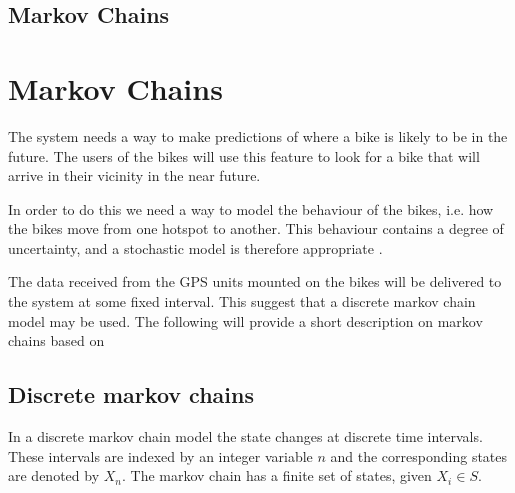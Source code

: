 \subsection{Markov Chains}












































\section{Markov Chains}\label{markov}
The system needs a way to make predictions of where a bike is likely to be in the future.
The users of the bikes will use this feature to look for a bike that will arrive in their vicinity in the near future.

In order to do this we need a way to model the behaviour of the bikes, i.e. how the bikes move from one hotspot to another.
This behaviour contains a degree of uncertainty, and a stochastic model is therefore appropriate \cite[p. ~296]{bertsekas2002introduction}.

The data received from the GPS units mounted on the bikes will be delivered to the system at some fixed interval.
This suggest that a discrete markov chain model may be used.
The following will provide a short description on markov chains based on \citet[chapter 7]{bertsekas2002introduction}

\subsection{Discrete markov chains}\label{markov:intro}
In a discrete markov chain model the state changes at discrete time intervals. 
These intervals are indexed by an integer variable $ n $ and the corresponding states are denoted by $ X_n $.
The markov chain has a finite set of states, given $X_i \in S$.

